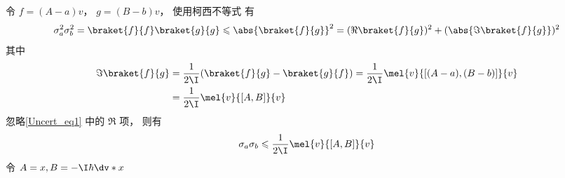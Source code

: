 

令 $f = (A-a)v$， $g = (B-b)v$， 使用柯西不等式 有
\begin{equation}\label{Uncert_eq1}
\sigma_a^2 \sigma_b^2 = \braket{f}{f} \braket{g}{g} \leqslant \abs{\braket{f}{g}}^2 = (\Re\braket{f}{g})^2 + (\abs{\Im\braket{f}{g}})^2
\end{equation}
其中
\begin{equation}
\begin{aligned}
\Im\braket{f}{g} &= \frac{1}{2\I}(\braket{f}{g} - \braket{g}{f})
= \frac{1}{2\I}\mel{v}{[(A-a), (B-b)]}{v}\\
&= \frac{1}{2\I}\mel{v}{[A, B]}{v}
\end{aligned}
\end{equation}
忽略\autoref{Uncert_eq1} 中的 $\Re$ 项， 则有
\begin{equation}
\sigma_a \sigma_b \leqslant \frac{1}{2\I}\mel{v}{[A, B]}{v}
\end{equation}
令 $A = x, B = -\I\hbar \dv*{x}$